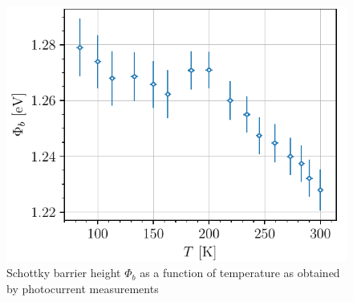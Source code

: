 \begin{figure}[htbp]
    \centering
    \includegraphics[scale=1]{figures/photoemission_phi.pdf}
    \caption{Schottky barrier height $\Phi_b$ as a function of temperature as obtained by photocurrent measurements}
    \label{fig:photoemission_phi}
\end{figure}


